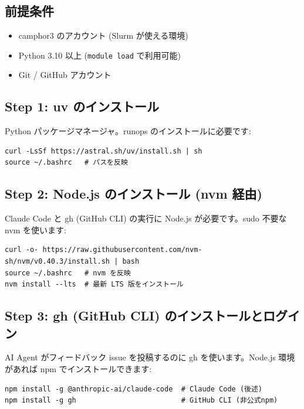 \documentclass[a4paper,11pt]{article}
\begin{document}
\subsection*{\color{accent} 前提条件}

\begin{itemize}[nosep]
  \item camphor3 のアカウント (Slurm が使える環境)
  \item Python 3.10 以上 (\texttt{module load} で利用可能)
  \item Git / GitHub アカウント
\end{itemize}

\subsection*{\color{accent} Step 1: uv のインストール}

Python パッケージマネージャ。runops のインストールに必要です:

\begin{lstlisting}
curl -LsSf https://astral.sh/uv/install.sh | sh
source ~/.bashrc   # パスを反映
\end{lstlisting}

\subsection*{\color{accent} Step 2: Node.js のインストール (nvm 経由)}

Claude Code と gh (GitHub CLI) の実行に Node.js が必要です。sudo 不要な nvm を使います:

\begin{lstlisting}
curl -o- https://raw.githubusercontent.com/nvm-sh/nvm/v0.40.3/install.sh | bash
source ~/.bashrc   # nvm を反映
nvm install --lts  # 最新 LTS 版をインストール
\end{lstlisting}

\subsection*{\color{accent} Step 3: gh (GitHub CLI) のインストールとログイン}

AI Agent がフィードバック issue を投稿するのに gh を使います。Node.js 環境があれば npm でインストールできます:

\begin{lstlisting}
npm install -g @anthropic-ai/claude-code  # Claude Code (後述)
npm install -g gh                         # GitHub CLI (非公式npm)
\end{lstlisting}
\end{document}
